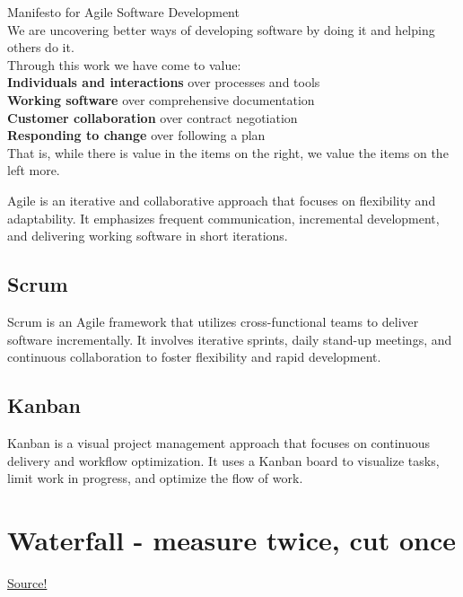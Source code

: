 \begin{center}
	{\Large Manifesto for Agile Software Development}\\
We are uncovering better ways of developing software by doing it and helping others do it.\\

Through this work we have come to value:\\

\textbf{Individuals and interactions} over processes and tools\\

\textbf{Working software} over comprehensive documentation\\

\textbf{Customer collaboration} over contract negotiation\\

\textbf{Responding to change} over following a plan\\

That is, while there is value in the items on the right, we value the items on the left more.
\end{center}

Agile is an iterative and collaborative approach that focuses on flexibility and adaptability. It emphasizes frequent communication, incremental development, and delivering working software in short iterations.

\subsection{Scrum}

Scrum is an Agile framework that utilizes cross-functional teams to deliver software incrementally. It involves iterative sprints, daily stand-up meetings, and continuous collaboration to foster flexibility and rapid development.

\subsection{Kanban}

Kanban is a visual project management approach that focuses on continuous delivery and workflow optimization. It uses a Kanban board to visualize tasks, limit work in progress, and optimize the flow of work.


\section{Waterfall - measure twice, cut once}
\href{https://business.adobe.com/blog/basics/waterfall#:~:text=The%20waterfall%20methodology%20is%20a,detailed%20documentation%2C%20and%20consecutive%20execution.}{Source!}\\

